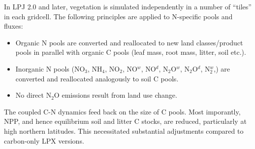 In LPJ 2.0 and later, vegetation is simulated independently in a number of ``tiles'' in each gridcell. The following principles are applied to N-specific pools and fluxes:
\begin{itemize}
  \item Organic N pools are converted and reallocated to new land classes/product pools in parallel with organic C pools (leaf mass, root mass, litter, soil etc.).
  \item Inorganic N pools (NO$_3$, NH$_4$, NO$_2$, NO$^w$, NO$^d$, N$_2$O$^w$, N$_2$O$^d$, N$_2^w$,) are converted and reallocated analogously to soil C pools.
  \item No direct N$_2$O emissions result from land use change.
\end{itemize}

The coupled C-N dynamics feed back on the size of C pools. Most imporantly, NPP, and hence equilibrium soil and litter C stocks, are reduced, particularly at high northern latitudes. This necessitated substantial adjustments compared to carbon-only LPX versions.

